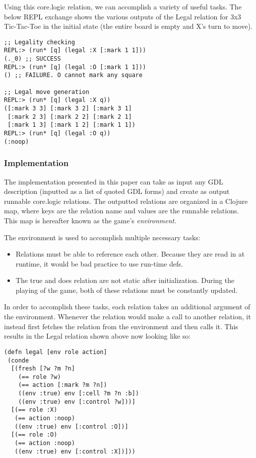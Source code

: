 \documentclass[letterpaper]{article}
\begin{document}
Using this core.logic relation, we can accomplish a variety of useful tasks. The below REPL exchange shows the various outputs of the Legal relation for 3x3 Tic-Tac-Toe in the initial state (the entire board is empty and X's turn to move).

\begin{lstlisting}[frame=single,caption=REPL exchange with the core.logic Legal relation for 3x3 Tic-Tac-Toe in the initial state]
;; Legality checking
REPL:> (run* [q] (legal :X [:mark 1 1]))
(._0) ;; SUCCESS
REPL:> (run* [q] (legal :O [:mark 1 1]))
() ;; FAILURE. O cannot mark any square

;; Legal move generation
REPL:> (run* [q] (legal :X q))
([:mark 3 3] [:mark 3 2] [:mark 3 1]
 [:mark 2 3] [:mark 2 2] [:mark 2 1]
 [:mark 1 3] [:mark 1 2] [:mark 1 1])
REPL:> (run* [q] (legal :O q))
(:noop)
\end{lstlisting}
\subsubsection{Implementation}

The implementation presented in this paper can take as input any GDL description (inputted as a list of quoted GDL forms) and create as output runnable core.logic relations. The outputted relations are organized in a Clojure map, where keys are the relation name and values are the runnable relations. This map is hereafter known as the game's \emph{environment}.

The environment is used to accomplish multiple necessary tasks:

\begin{itemize}
\item Relations must be able to reference each other. Because they are read in at runtime, it would be bad practice to use run-time defs.
\item The true and does relation are not static after initialization. During the playing of the game, both of these relations must be constantly updated.
\end{itemize}

 In order to accomplish these tasks, each relation takes an additional argument of the environment. Whenever the relation would make a call to another relation, it instead first fetches the relation from the environment and then calls it. This results in the Legal relation shown above now looking like so:

\begin{lstlisting}[frame=single, caption=The Legal relation translated into core.logic]
(defn legal [env role action]
 (conde
  [(fresh [?w ?m ?n]
    (== role ?w)
    (== action [:mark ?m ?n])
    ((env :true) env [:cell ?m ?n :b])
    ((env :true) env [:control ?w]))]
  [(== role :X)
   (== action :noop)
   ((env :true) env [:control :O])]
  [(== role :O)
   (== action :noop)
   ((env :true) env [:control :X])]))
\end{lstlisting}
\end{document}
